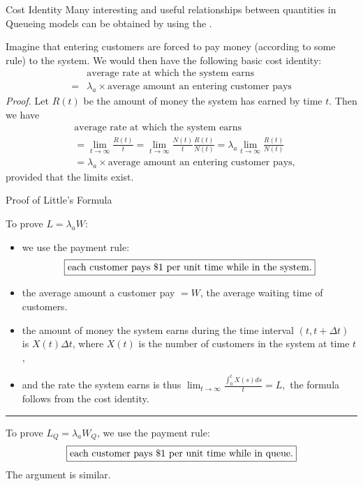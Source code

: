 \documentclass[letterpaper,handout]{beamer}
\def\dt{\Delta}
\begin{document}
\begin{frame}{Cost Identity}
Many interesting and useful relationships between quantities in Queueing models can be obtained by using the .\smallskip

Imagine that entering customers are forced to pay money (according to some
rule) to the system. We would then have the following basic cost identity:
\begin{align*}
&\text{average rate at which the system earns}\\
={}&\lambda_a\times \text{average amount an entering customer pays}
\end{align*}
{\em Proof.} Let $R(t)$ be the amount of money the system has earned by time $t$. Then we have
\begin{align*}
&\text{average rate at which the system earns}\\
&=\lim_{t\to\infty}\frac{R(t)}{t}=\lim_{t\to\infty}\frac{N(t)}{t}\frac{R(t)}{N(t)}
=\lambda_a\lim_{t\to\infty}\frac{R(t)}{N(t)}\\
&=\lambda_a\times \text{average amount an entering customer pays},
\end{align*}
provided that the limits exist.
\end{frame}
\begin{frame}{Proof of Little's Formula}

To prove $L=\lambda_a W$:
\begin{itemize}
\item we use the payment rule:
$$\text{\fbox{each customer pays \$1 per unit time while in the system.}}$$
\item the average amount a customer pay $= W$, the average waiting time of customers.
\item the amount of money the system earns during the time interval $(t,t+\dt t)$ is $X(t)\dt t$, where $X(t)$ is the number of customers in the system at time $t$ ,
\item and the rate the system earns is thus $\displaystyle\lim_{t\to\infty}\frac{\int_0^{t}X(s)ds}{t}=L,$
the formula follows from the cost identity.
\end{itemize}
\medskip\hrule\medskip
To prove $L_Q=\lambda_a W_Q$, we use the payment rule:
$$\text{\fbox{each customer pays \$1 per unit time while in queue.}}$$
The argument is similar.
\end{frame}
\end{document}
